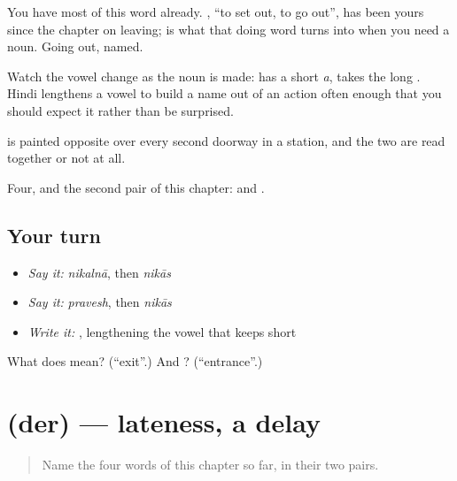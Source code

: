 You have most of this word already. \textbf{}, \textquotedblleft{}to set out, to go out\textquotedblright{}, has been yours since the chapter on leaving;  is what that doing word turns into when you need a noun. Going out, named.

Watch the vowel change as the noun is made: \textbf{} has a short \emph{a}, \textbf{} takes the long . Hindi lengthens a vowel to build a name out of an action often enough that you should expect it rather than be surprised.

 is painted opposite  over every second doorway in a station, and the two are read together or not at all.

\begin{grammarlens}[title={What you've built}]
Four, and the second pair of this chapter:  and .
\end{grammarlens}

\subsection*{Your turn}
\begin{itemize}
\raggedright
  \item \emph{Say it:} \emph{nikalnā}, then \emph{nikās}
  \item \emph{Say it:} \emph{pravesh}, then \emph{nikās}
  \item \emph{Write it:} , lengthening the vowel that  keeps short
\end{itemize}

\begin{tcolorbox}[breakable,colback=teal!4,colframe=teal!35!black,title={Before you move on}]
What does  mean? (\textquotedblleft{}exit\textquotedblright{}.) And ? (\textquotedblleft{}entrance\textquotedblright{}.)
\end{tcolorbox}
\section[der]{ (der) — lateness, a delay}

\label{lesson:HI-C74-late}



\begin{quote}
Name the four words of this chapter so far, in their two pairs.
\end{quote}

